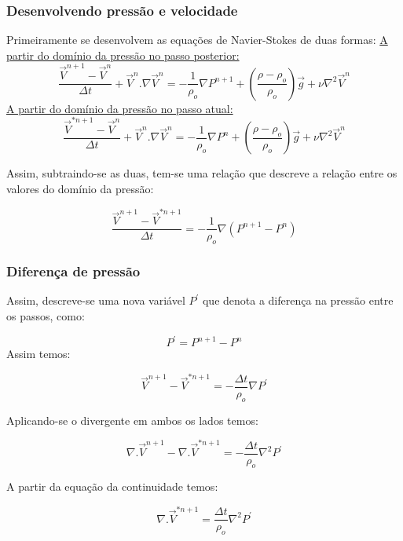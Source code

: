 \documentclass[xcolor=dvipsnames,10pt,aspectratio=169]{beamer}
\begin{document}
	
	\begin{frame}
		\frametitle{Desenvolvendo pressão e velocidade}
		\flushleft
		Primeiramente se desenvolvem as equações de Navier-Stokes de duas formas:\vspace{0.5cm}
		\centering
		\underline{A partir do domínio da pressão no passo posterior:}
		\begin{equation}
		\frac{\vec{V}^{n + 1} - \vec{V}^{n}}{\Delta t} + \vec{V}^{n} . {\nabla} \vec{V}^{n} = - \frac{1}{\rho_o}\nabla P^{n + 1} + \left( \frac{\rho - \rho_o}{\rho_o} \right) \vec{g} + \nu \nabla^2 \vec{V}^{n}
		\end{equation}\label{equation1}
		\underline{A partir do domínio da pressão no passo atual:}
		\begin{equation}
		\frac{\vec{V}^{\ast{n + 1}} - \vec{V}^{n}}{\Delta t} + \vec{V}^{n} . {\nabla} \vec{V}^{n} = - \frac{1}{\rho_o}\nabla P^{n} + \left( \frac{\rho - \rho_o}{\rho_o} \right) \vec{g} + \nu \nabla^2 \vec{V}^{n}
		\end{equation}
		
		Assim, subtraindo-se as duas, tem-se uma relação que descreve a relação entre os valores do domínio da pressão:
		
		\begin{equation}
		\frac{\vec{V}^{{n + 1}} - \vec{V}^{{\ast n+1} }}{\Delta t} = - \frac{1}{\rho_o}\nabla \left( P^{n+1} - P ^n\right)
		\end{equation}
		
		
		
	\end{frame}




	\begin{frame}
		\frametitle{Diferença de pressão}
		\flushleft
		Assim, descreve-se uma nova variável $ P^\prime $ que denota a diferença na pressão entre os passos, como:
		
		\begin{equation}
		P^\prime = P^{n + 1} - P^n
		\end{equation}
		Assim temos:
		
		\begin{equation}
		\vec{V}^{n+1} - \vec{V}^{\ast{n + 1}} = - \frac{\Delta t}{\rho_o} \nabla P^\prime
		\end{equation}
		
		Aplicando-se o divergente em ambos os lados temos:
		
		\begin{equation}
		\nabla . \vec{V}^{n+1} - \nabla .\vec{V}^{\ast{n + 1}} = - \frac{\Delta t}{\rho_o} \nabla^2 P^\prime
		\end{equation}
		
		A partir da equação da continuidade temos:
		
		\begin{equation}
		\nabla .\vec{V}^{\ast{n + 1}} = \frac{\Delta t}{\rho_o} \nabla^2 P^\prime
		\end{equation}
		
	
	\end{frame}
\end{document}
